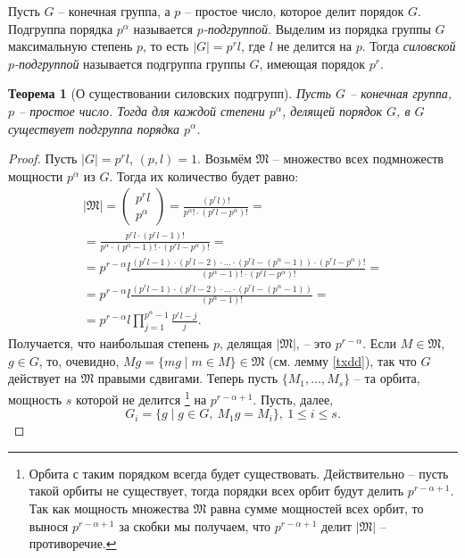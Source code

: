 \documentclass{article}
\newtheorem{theorem}{Теорема}[section]
\begin{document}
Пусть $G$ -- конечная группа, а $p$ -- простое число, которое делит порядок $G$. Подгруппа порядка $p^\alpha$ называется \textit{$p$-подгруппой}.
Выделим из порядка группы $G$ максимальную степень $p$, то есть $|G| = p^r l$, где $l$ не делится на $p$. Тогда \textit{силовской $p$-подгруппой} называется подгруппа группы $G$, имеющая порядок $p^r.$

\begin{theorem}[О существовании силовских подгрупп]
    Пусть $G$ -- конечная группа, $p$ -- простое число. Тогда для каждой степени $p^\alpha$, делящей порядок $G$, в $G$ существует подгруппа порядка $p^\alpha$.
\end{theorem}
\begin{proof}
    Пусть $|G| = p^r l$, $(p, l) = 1$. Возьмём $\mathfrak{M}$ -- множество всех подмножеств мощности $p^\alpha$ из $G$. Тогда их количество будет равно: 
    \begin{multline*}
        |\mathfrak{M}| = 
        \begin{pmatrix}
            p^r l \\
            p^\alpha 
        \end{pmatrix}
        = \frac{(p^r l)!}{p^\alpha! \cdot (p^r l - p^\alpha)!} = \\
        = \frac{p^r l \cdot (p^r l - 1)!}{p^\alpha \cdot (p^\alpha - 1)! \cdot (p^r l - p^\alpha)!}  = \\
        = p^{r - \alpha} l \frac{(p^r l - 1) \cdot (p^r l - 2) \cdot \ldots \cdot (p^r l - (p^\alpha - 1)) \cdot (p^r l - p^\alpha)!}{(p^\alpha - 1)! \cdot (p^r l - p^\alpha)!} = \\
        = p^{r - \alpha} l \frac{(p^r l - 1) \cdot (p^r l - 2) \cdot \ldots \cdot (p^r l - (p^\alpha - 1))}{(p^\alpha - 1)!} = \\
        = p^{r - \alpha} l \prod_{j = 1}^{p^\alpha - 1} \frac{p^r l - j}{j}.
    \end{multline*}
    Получается, что наибольшая степень $p$, делящая $|\mathfrak{M}|$, -- это $ p^{r - \alpha} $. Если $M \in \mathfrak{M}$, $g \in G$, то, очевидно, $Mg = \{ mg \mid m \in M \} \in \mathfrak{M}$ (см. лемму \ref{txdd}), так что $G$ действует на $\mathfrak{M}$ правыми сдвигами. Теперь пусть $\{M_1, \ldots , M_s\}$ -- та орбита, мощность $s$ которой не делится 
    \footnote{Орбита с таким порядком всегда будет существовать. Действительно -- пусть такой орбиты не существует, тогда порядки всех орбит будут делить $p^{r - \alpha + 1}$. Так как мощность множества $\mathfrak{M}$ равна сумме мощностей всех орбит, то вынося $p^{r - \alpha + 1}$ за скобки мы получаем, что $p^{r - \alpha + 1}$ делит $|\mathfrak{M}|$ -- противоречие. } на $p^{r - \alpha + 1}$. Пусть, далее, $$ G_i = \{ g \mid g \in G, \ M_1 g = M_i \}, \ 1 \leqslant i \leqslant s. $$


\end{proof}
\end{document}
